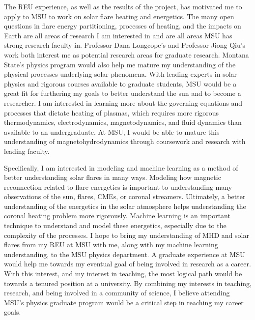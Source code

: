 \documentclass[11pt,letterpaper]{article}
\begin{document}
The REU experience, as well as the results of the project, has motivated me to apply to MSU to work on solar flare heating and energetics. The many open questions in flare energy partitioning, processes of heating, and the impacts on Earth are all areas of research I am interested in and are all areas MSU has strong research faculty in. Professor Dana Longcope's and Professor Jiong Qiu's work both interest me as potential research areas for graduate research. Montana State's physics program would also help me mature my understanding of the physical processes underlying solar phenomena. With leading experts in solar physics and rigorous courses available to graduate students, MSU would be a great fit for furthering my goals to better understand the sun and to become a researcher. I am interested in learning more about the governing equations and processes that dictate heating of plasmas, which requires more rigorous thermodynamics, electrodynamics, magnetodynamics, and fluid dynamics than available to an undergraduate. At MSU, I would be able to mature this understanding of magnetohydrodynamics through coursework and research with leading faculty.

Specifically, I am interested in modeling and machine learning as a method of better understanding solar flares in many ways. Modeling how magnetic reconnection related to flare energetics is important to understanding many observations of the sun, flares, CMEs, or coronal streamers. Ultimately, a better understanding of the energetics in the solar atmosphere helps understanding the coronal heating problem more rigorously. Machine learning is an important technique to understand and model these energetics, especially due to the complexity of the processes. I hope to bring my understanding of MHD and solar flares from my REU at MSU with me, along with my machine learning understanding, to the MSU physics department. A graduate experience at MSU would help me towards my eventual goal of being involved in research as a career. With this interest, and my interest in teaching, the most logical path would be towards a tenured position at a university. By combining my interests in teaching, research, and being involved in a community of science, I believe attending MSU's physics graduate program would be a critical step in reaching my career goals.
\end{document}
